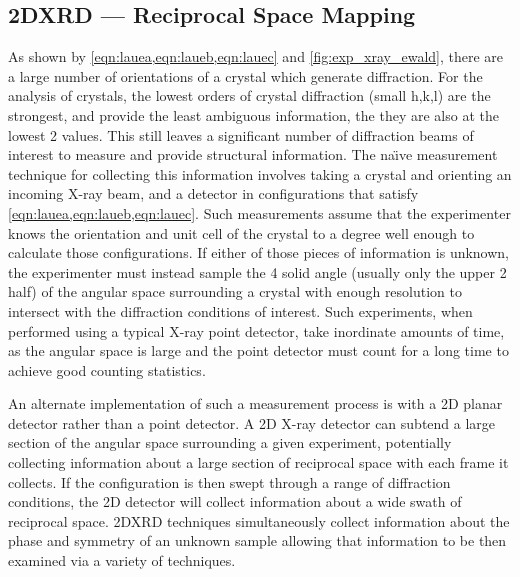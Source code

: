 \subsection{2DXRD --- Reciprocal Space Mapping}
\label{sec:2DXRD}
As shown by \cref{eqn:lauea,eqn:laueb,eqn:lauec} and \cref{fig:exp_xray_ewald}, there are a large number of orientations of a crystal which generate diffraction.
For the analysis of crystals, the lowest orders of crystal diffraction (small h,k,l) are the strongest, and provide the least ambiguous information, the they are also at the lowest 2\straighttheta{} values.
This still leaves a significant number of diffraction beams of interest to measure and provide structural information.
The na\"{\i}ve measurement technique for collecting this information involves taking a crystal and orienting an incoming X-ray beam, and a detector in configurations that satisfy \cref{eqn:lauea,eqn:laueb,eqn:lauec}.
Such measurements assume that the experimenter knows the orientation and unit cell of the crystal to a degree well enough to calculate those configurations.
If either of those pieces of information is unknown, the experimenter must instead sample the 4\textpi{} solid angle (usually only the upper 2\textpi{} half) of the angular space surrounding a crystal with enough resolution to intersect with the diffraction conditions of interest.
Such experiments, when performed using a typical X-ray point detector, take inordinate amounts of time, as the angular space is large and the point detector must count for a long time to achieve good counting statistics.

An alternate implementation of such a measurement process is with a 2D planar detector rather than a point detector.
A 2D X-ray detector can subtend a large section of the angular space surrounding a given experiment, potentially collecting information about a large section of reciprocal space with each frame it collects.
If the configuration is then swept through a range of diffraction conditions, the 2D detector will collect information about a wide swath of reciprocal space.
2DXRD techniques simultaneously collect information about the phase and symmetry of an unknown sample allowing that information to be then examined via a variety of techniques.

